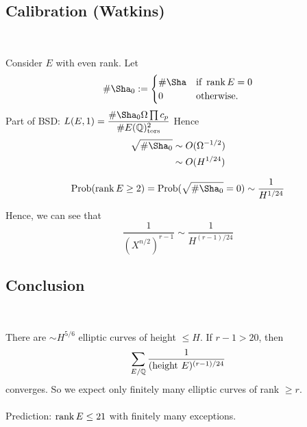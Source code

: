 \documentclass[12pt,amsfont]{amsart}
\begin{document}
\subsection{Calibration (Watkins)}
{\ }

Consider $E$ with even rank. Let 
\[\# \Sha_0 : =\begin{cases} \#\Sha & \text{if } \rank E = 0 \\ 0 & \text{otherwise.} \end{cases} \]
Part of BSD: $L(E,1) = \displaystyle \frac{\# \Sha_0 \Omega \prod c_p}{\# E(\bQ)_{\text{tors}}^2}$
Hence
\begin{align*} \sqrt{\# \Sha_0} & \sim O(\Omega^{-1/2}) \\
& \sim O(H^{1/24}) \end{align*}

\[\operatorname{Prob}(\rank E \geq 2) = \operatorname{Prob}(\sqrt{\# \Sha_0} = 0) \sim \frac{1}{H^{1/24}} \]

Hence, we can see that
\[\frac{1}{(X^{n/2})^{r-1}} \sim \frac{1}{H^{(r-1)/24}} \]

\subsection{Conclusion}
{\ }

There are $\sim H^{5/6}$ elliptic curves of height $\leq H$. If $r - 1 > 20$, then 
\[\sum_{E/{\mathbb Q}} \frac{1}{(\text{height } E)^{(r-1)/24}} \]
converges. So we expect only finitely many elliptic curves of rank $\geq r$. \\ \\
Prediction: $\operatorname{rank} E \leq 21$ with finitely many exceptions. 

\renewcommand{\thesubsection}{\arabic{section}.R}
\begingroup
\renewcommand{\addcontentsline}[3]{}%
\endgroup
\end{document}
